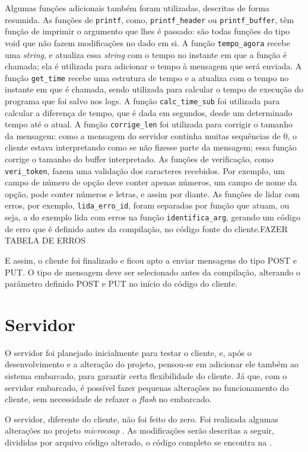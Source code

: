 Algumas funções adicionais também foram utilizadas, descritas de forma resumida.
As funções de \texttt{printf}, como, \texttt{printf\_header} ou \texttt{printf\_buffer}, têm função de imprimir o argumento que lhes é passado: são todas funções do tipo void que não fazem modificações no dado em si.
A função \texttt{tempo\_agora} recebe uma \textit{string}, e atualiza essa \textit{string} com o tempo no instante em que a função é chamada; ela é utilizada para adicionar o tempo à mensagem que será enviada.
A função \texttt{get\_time} recebe uma estrutura de tempo e a atualiza com o tempo no instante em que é chamada, sendo utilizada para calcular o tempo de execução do programa que foi salvo nos logs.
A função \texttt{calc\_time\_sub} foi utilizada para calcular a diferença de tempo, que é dada em segundos, desde um determinado tempo até o atual.
A função \texttt{corrige\_len} foi utilizada para corrigir o tamanho da mensagem: como a mensagem do servidor continha muitas sequências de 0, o cliente estava interpretando como se não fizesse parte da mensagem; essa função corrige o tamanho do buffer interpretado.
As funções de verificação, como \texttt{veri\_token}, fazem uma validação dos caracteres recebidos. Por exemplo, um campo de número de opção deve conter apenas números, um campo de nome da opção, pode conter números e letras, e assim por diante.
As funções de lidar com erros, por exemplo, \texttt{lida\_erro\_id}, foram separadas por função que atuam, ou seja, a do exemplo lida com erros na função \texttt{identifica\_arg}, gerando um código de erro que é definido antes da compilação, no código fonte do cliente.FAZER TABELA DE ERROS%

E assim, o cliente foi finalizado e ficou apto a enviar mensagens do tipo POST e PUT. O tipo de mensagem deve ser selecionado antes da compilação, alterando o parâmetro definido POST e PUT no início do código do cliente.

\section{Servidor}

O servidor foi planejado inicialmente para testar o cliente, e, após o desenvolvimento e a alteração do projeto, pensou-se em adicionar ele também ao sistema embarcado, para garantir certa flexibilidade do cliente. Já que, com o servidor embarcado, é possível fazer pequenas alterações no funcionamento do cliente, sem necessidade de refazer o \textit{flash} no embarcado.

O servidor, diferente do cliente, não foi feito do zero. Foi realizada algumas alterações no projeto \textit{microcoap} \cite{microcoap}. As modificações serão descritas a seguir, divididas por arquivo código alterado, o código completo se encontra na \cite{microcoap}. 

